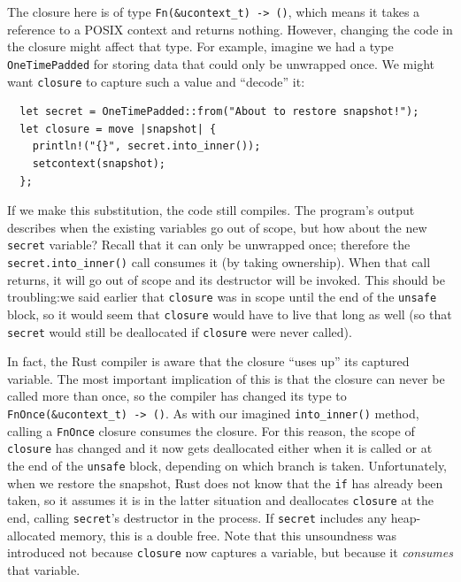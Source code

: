 The closure here is of type \texttt{Fn(\&ucontext\_t) -> ()}, which means it takes a
reference to a POSIX context and returns nothing.  However, changing the code in the
closure might affect that type.  For example, imagine we had a type
\texttt{OneTimePadded} for storing data that could only be unwrapped once.  We might
want \texttt{closure} to capture such a value and ``decode'' it:
\begin{lstlisting}
  let secret = OneTimePadded::from("About to restore snapshot!");
  let closure = move |snapshot| {
  	println!("{}", secret.into_inner());
	setcontext(snapshot);
  };
\end{lstlisting}

If we make this substitution, the code still compiles.  The program's output
describes when the existing variables go out of scope, but how about the new
\texttt{secret} variable?  Recall that it can only be unwrapped once; therefore the
\texttt{secret.into\_inner()} call consumes it (by taking ownership).  When that call
returns, it will go out of scope and its destructor will be invoked.  This should be
troubling:\@ we said earlier that \texttt{closure} was in scope until the end of the
\texttt{unsafe} block, so it would seem that \texttt{closure} would have to live that
long as well (so that \texttt{secret} would still be deallocated if \texttt{closure}
were never called).

In fact, the Rust compiler is aware that the closure ``uses up'' its captured
variable.  The most important implication of this is that the closure can never be
called more than once, so the compiler has changed its type to
\texttt{FnOnce(\&ucontext\_t) -> ()}.  As with our imagined \texttt{into\_inner()}
method, calling a \texttt{FnOnce} closure consumes the closure.  For this reason, the
scope of \texttt{closure} has changed and it now gets deallocated either when it is
called or at the end of the \texttt{unsafe} block, depending on which branch is
taken.  Unfortunately, when we restore the snapshot, Rust does not know that the
\texttt{if} has already been taken, so it assumes it is in the latter situation and
deallocates \texttt{closure} at the end, calling \texttt{secret}'s destructor in the
process.  If \texttt{secret} includes any heap-allocated memory, this is a double
free.  Note that this unsoundness was introduced not because \texttt{closure} now
captures a variable, but because it \textit{consumes} that variable.

